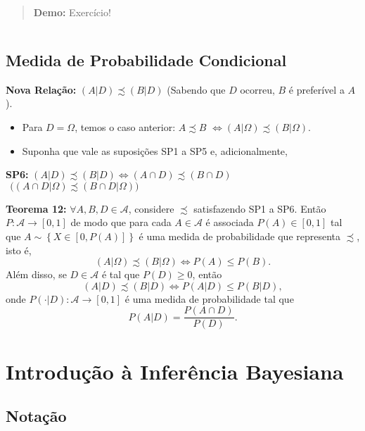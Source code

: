 \documentclass[
]{book}
\begin{document}
\begin{quote}
\textbf{Demo:} Exercício!
\end{quote}

\(~\)

\hypertarget{medida-de-probabilidade-condicional}{%
\section{Medida de Probabilidade Condicional}\label{medida-de-probabilidade-condicional}}

\textbf{Nova Relação:} \((A|D) \precsim (B|D)\) (Sabendo que \(D\) ocorreu, \(B\) é preferível a \(A\)).

\begin{itemize}
\item
  Para \(D = \Omega\), temos o caso anterior: \(A \precsim B\) \(\Leftrightarrow (A|\Omega) \precsim (B|\Omega)\).
\item
  Suponha que vale as suposições SP1 a SP5 e, adicionalmente,
\end{itemize}

\textbf{SP6:} \((A|D) \precsim (B|D) \Leftrightarrow (A \cap D) \precsim (B \cap D)\) \(~~\Big( (A \cap D|\Omega) \precsim (B \cap D|\Omega) \Big)\)

\textbf{Teorema 12:} \(\forall A, B, D \in \mathcal{A}\), considere \(\precsim\) satisfazendo SP1 a SP6. Então \(P: \mathcal{A} \rightarrow [0,1]\) de modo que para cada \(A \in \mathcal{A}\) é associada \(P(A) \in [0,1]\) tal que \(A \sim \left\{X \in \left[0,P(A)\right]\right\}\) é uma medida de probabilidade que representa \(\precsim\), isto é, \[(A|\Omega) \precsim (B|\Omega) \Leftrightarrow P(A) \leq P(B).\] Além disso, se \(D \in \mathcal{A}\) é tal que \(P(D) \geq 0\), então \[(A|D) \precsim (B|D) \Leftrightarrow P(A|D) \leq P(B|D),\] onde \(P(\cdot|D): \mathcal{A} \rightarrow [0,1]\) é uma medida de probabilidade tal que
\[P(A|D) = \frac{P(A \cap D)}{P(D)}.\]

\hypertarget{introbayes}{%
\chapter{Introdução à Inferência Bayesiana}\label{introbayes}}

\hypertarget{notauxe7uxe3o}{%
\section{Notação}\label{notauxe7uxe3o}}
\end{document}

